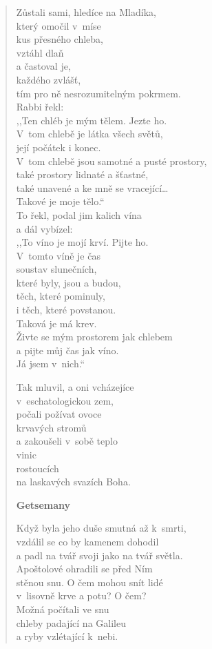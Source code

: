 \begin{verse}
Zůstali sami, hledíce na Mladíka, \\
který omočil v míse \\
kus přesného chleba, \\
vztáhl dlaň \\
a častoval je,  \\
každého zvlášť, \\
tím pro ně nesrozumitelným pokrmem. \\
Rabbi řekl: \\
,,Ten chléb je mým tělem. Jezte ho. \\
V tom chlebě je látka všech světů, \\
její počátek i konec. \\
V tom chlebě jsou samotné a pusté prostory, \\
také prostory lidnaté a šťastné, \\
také unavené a ke mně se vracející\ldots \\
Takové je moje tělo.`` \\
To řekl, podal jim kalich vína \\
a dál vybízel: \\
,,To víno je mojí krví. Pijte ho. \\
V tomto víně je čas \\
soustav slunečních, \\
které byly, jsou a budou, \\
těch, které pominuly, \\
i těch, které povstanou. \\
Taková je má krev. \\
Živte se mým prostorem jak chlebem \\
a pijte můj čas jak víno. \\
Já jsem v nich.``

\medskip

Tak mluvil, a oni vcházejíce \\
v eschatologickou zem, \\
počali požívat ovoce \\
krvavých stromů \\
a zakoušeli v sobě teplo \\
vinic \\
rostoucích \\
na laskavých svazích Boha.

\bigskip


\textbf{Getsemany}

\medskip

Když byla jeho duše smutná až k smrti, \\
vzdálil se co by kamenem dohodil \\
a padl na tvář svoji jako na tvář světla. \\
Apoštolové ohradili se před Ním \\
stěnou snu. O čem mohou snít lidé \\
v lisovně krve a potu? O čem? \\
Možná počítali ve snu \\
chleby padající na Galileu \\
a ryby vzlétající k nebi.


\end{verse}
